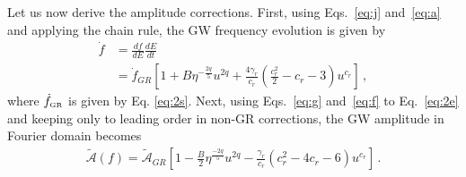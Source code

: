 \documentclass[prd,twocolumn,nofootinbib]{revtex4-1}
\newcommand{\GR}{{\mbox{\tiny GR}}}
\begin{document}
 Let us now derive the amplitude corrections. First, using Eqs.~\eqref{eq:j} and~\eqref{eq:a} and applying the chain rule, the GW frequency evolution is given by
 \begin{align}\label{eq:f}
 \dot{f}&=\frac{df}{dE}\frac{dE}{dt}\nonumber\\ &=\dot{f}_{GR}\left[1+B\eta^{-\frac{2q}{5}} u^{2q}+\frac{4 \gamma_r}{c_r}\left(\frac{c_r^2}{2}-c_r-3\right)u^{c_r}\right]\,,
 \end{align}
where $\dot{f}_{\GR}$ is given by Eq. \eqref{eq:2s}. 
Next, using Eqs.~\eqref{eq:g} and~\eqref{eq:f} to Eq.~\eqref{eq:2e} and keeping only to leading order in non-GR corrections, the GW amplitude in Fourier domain becomes
\begin{align}\label{eq:o}
\tilde{\mathcal{A}}(f)=\tilde{\mathcal{A}}_{GR} \left[1-\frac{B}{2}\eta^{\frac{-2q}{5}}u^{2q}-\frac{\gamma_r}{c_r}(c^2_r-4c_r-6)u^{c_r}\right]\,.
\end{align}
\end{document}
